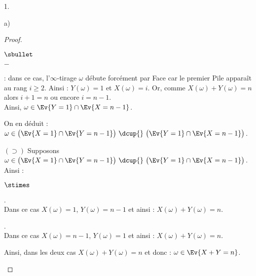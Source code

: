 \begin{noliste}{1.}
\begin{noliste}{a)}
\begin{proof}
\begin{liste}{$\sbullet$}
\begin{noliste}{$-$}
        \item {} : dans ce
          cas, l'$\infty$-tirage $\omega$ débute forcément par Face
          car le premier Pile apparaît au rang $ i\geq 2$. Ainsi :
          $Y(\omega) = 1$ et $X(\omega) = i$. Or, comme $X(\omega) +
          Y(\omega) = n$ alors  $i+1 = n$ ou encore $i = n-1$.\\[.2cm]
          Ainsi, $\omega \in \Ev{Y = 1} \cap \Ev{X = n-1}$.
        \end{noliste}
        On en déduit : $\omega \in \big( \Ev{X = 1} \cap \Ev{Y = n-1}
        \big) \ \dcup{} \ \big( \Ev{Y = 1} \cap \Ev{X = n-1} \big)$.

      \item[$(\supset)$] Supposons $\omega \in \big( \Ev{X = 1} \cap
        \Ev{Y = n-1} \big) \ \dcup{} \ \big( \Ev{Y = 1} \cap \Ev{X =
          n-1} \big)$. Ainsi :
        \begin{noliste}{$\stimes$}
        \item {}.\\[.1cm]
          Dans ce cas $X(\omega) = 1$, $Y(\omega) = n-1$ et ainsi :
          $X(\omega) + Y(\omega) = n$.

        \item {}.\\[.1cm]
          Dans ce cas $X(\omega) = n-1$, $Y(\omega) = 1$ et ainsi :
          $X(\omega) + Y(\omega) = n$.
        \end{noliste}
        Ainsi, dans les deux cas $X(\omega) + Y(\omega) = n$ et donc :
        $\omega \in \Ev{X + Y = n}$.
      \end{liste}



\end{proof}
\end{noliste}
\end{noliste}
